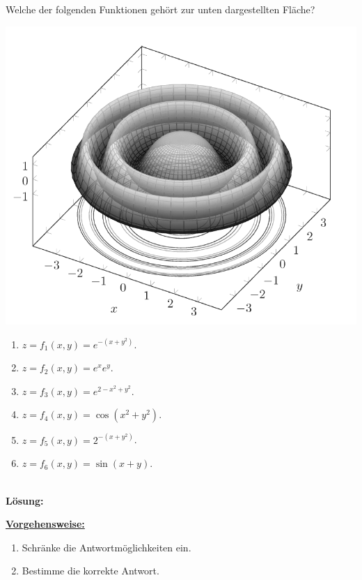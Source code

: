\subsection*{}
Welche der folgenden Funktionen gehört zur unten dargestellten Fläche?\\
\begin{center}
	\includegraphics[scale=0.5]{pictures/3_5}
\end{center}
\renewcommand{\labelenumi}{(\alph{enumi})}
\begin{enumerate}
	\item 
	$ z = f_1(x,y) = e^{-(x+y^2)} $.
	\item
	$ z = f_2(x,y) = e^{x} e^y $.
	\item
	$ z = f_3(x,y) = e^{2 -x^2 +y^2}  $.
	\item
	$ z = f_4(x,y) = \cos(x^2 +y^2) $.
	\item
	$ z = f_5(x,y) = 2^{-(x + y^2)} $.
	\item
	$ z = f_6(x,y) = \sin(x+y) $.
\end{enumerate}
\ \\
\textbf{Lösung:}
\begin{mdframed}
\underline{\textbf{Vorgehensweise:}}
\renewcommand{\labelenumi}{\theenumi.}
\begin{enumerate}
\item Schränke die Antwortmöglichkeiten ein.
\item Bestimme die korrekte Antwort.
\end{enumerate}
\end{mdframed}

